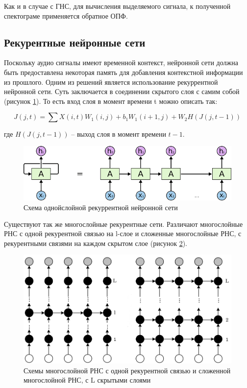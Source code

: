 Как и в случае с ГНС, для вычисления выделяемого сигнала, к полученной спектограме применяется обратное ОПФ.

\subsection{Рекурентные нейронные сети}

Поскольку аудио сигналы имеют временной контекст, нейронной сети должна быть предоставлена некоторая память для добавления контекстной информации из прошлого. Одним из решений является использование рекуррентной нейронной сети. Суть заключается в соединении скрытого слоя с самим собой (рисунок \ref{anal:rnn}). То есть вход слоя в момент времени t можно описать так:

\begin{equation}
J(j,t) = \sum X(i,t) W_1(i,j) + b_1 W_1(i+1, j) + W_2 H( J(j, t-1) )
\end{equation}

где $H(J(j,t-1))$ -- выход слоя в момент времени $t-1$. 

\begin{figure}
	\centering
	\includegraphics[width=\textwidth]{inc/img/rnn-simple.png}
	\caption{Схема однойслойной рекуррентной нейронной сети}
	\label{anal:rnn}
\end{figure}

Существуют так же многослойные рекурентные сети. Различают многослойные РНС с одной рекурентной связью на l-слое и сложенные многослойные РНС, с рекурентными связями на каждом скрытом слое (рисунок \ref{anal:drnn}).

\begin{figure}
	\centering
	\includegraphics[width=\textwidth]{inc/img/rdnn.png}
	\caption{Схемы многослойной РНС с одной рекурентной связью и сложенной многослойной РНС, с L скрытыми слоями}
	\label{anal:drnn}
\end{figure}

